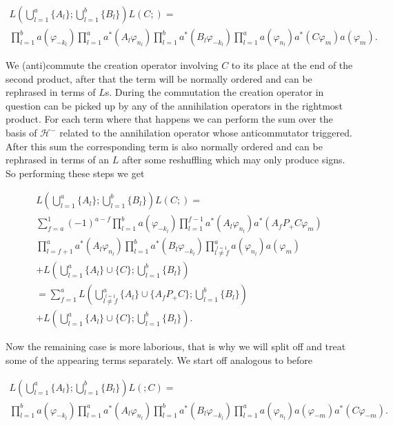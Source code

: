 \documentclass[b5paper,draft,openbib,12pt]{memoir}
\begin{document}
\begin{multline}
L\left(\bigcup_{l=1}^a \{A_l\}; \bigcup_{l=1}^b \{B_l\}\right) L(C;)=\\
\prod_{l=1}^b a(\varphi_{-k_l}) \prod_{l=1}^a a^*(A_l \varphi_{n_l}) \prod_{l=1}^b a^*(B_l \varphi_{-k_l}) \prod_{l=1}^a a(\varphi_{n_l}) a^*(C \varphi_m) a(\varphi_m).
\end{multline}

We (anti)commute the creation operator involving \(C\) to its place at the end of the second product, after that the term
will be normally ordered and can be rephrased in terms of \(L\)s. During the commutation the creation operator
in question can be picked up by any of the annihilation operators in the rightmost product. For each term where that happens
we can perform the sum over the basis of \(\mathcal{H}^-\) related to the annihilation operator whose anticommutator triggered.
After this sum the corresponding term is also normally ordered and can be rephrased in terms of an \(L\) after some 
reshuffling which may only produce signs. So performing these steps we get

\begin{multline}
L\left(\bigcup_{l=1}^a \{A_l\}; \bigcup_{l=1}^b \{B_l\}\right) L(C;)=\\
\sum_{f=a}^1 (-1)^{a-f} \prod_{l=1}^b a(\varphi_{-k_l}) \prod_{l=1}^{f-1} a^*(A_l \varphi_{n_l}) a^*(A_fP_+C\varphi_m)\\
 \prod_{l=f+1}^a a^*(A_l \varphi_{n_l}) \prod_{l=1}^b a^*(B_l \varphi_{-k_l}) \prod_{\stackrel{l=1}{l\neq f}}^a a(\varphi_{n_l}) a(\varphi_m)\\
+ L\left(\bigcup_{l=1}^a \{A_l\} \cup \{C\}; \bigcup_{l=1}^b \{B_l\}\right)\\
=\sum_{f=1}^a  L\left(\bigcup_{\stackrel{l=1}{l \neq f}}^a \{A_l\} \cup \{A_f P_+ C\}; \bigcup_{l=1}^b \{B_l\}\right)\\
+ L\left(\bigcup_{l=1}^a \{A_l\} \cup \{C\}; \bigcup_{l=1}^b \{B_l\}\right).
\end{multline}

Now the remaining case is more laborious, that is why we will split off and treat some of the appearing terms separately. 
We start off analogous to before 

\begin{multline}
L\left(\bigcup_{l=1}^a \{A_l\}; \bigcup_{l=1}^b \{B_l\}\right) L(;C)=\\
\prod_{l=1}^b a(\varphi_{-k_l}) \prod_{l=1}^a a^*(A_l \varphi_{n_l}) \prod_{l=1}^b a^*(B_l \varphi_{-k_l}) \prod_{l=1}^a a(\varphi_{n_l})a(\varphi_{-m}) a^*(C \varphi_{-m}).
\end{multline}
\end{document}

